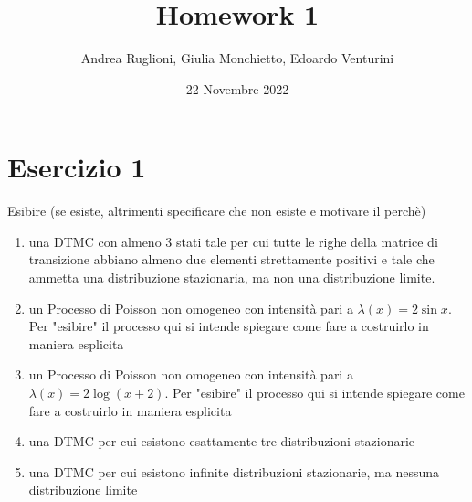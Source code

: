 \documentclass[
	12pt, %
]{fphw}
\title{Homework 1} %
\author{Andrea Ruglioni, Giulia Monchietto, Edoardo Venturini} %
\date{22 Novembre 2022} %
\institute{Politecnico di Torino} %
\begin{document}
\maketitle %

\section*{Esercizio 1}
\begin{problem}
	\smallskip
	Esibire (se esiste, altrimenti specificare che non esiste e motivare il perchè)
	\begin{enumerate}
		\item una DTMC con almeno 3 stati tale per cui tutte le righe della
		matrice di transizione abbiano almeno due elementi strettamente positivi e tale che ammetta una distribuzione stazionaria,
		ma non una distribuzione limite.
		\item un Processo di Poisson non omogeneo con intensità pari a $\lambda(x) = 2\sin x$. Per "esibire" il processo qui si intende spiegare come fare
		a costruirlo in maniera esplicita
		\item un Processo di Poisson non omogeneo con intensità pari a $\lambda(x) = 2\log (x+2)$. Per "esibire" il processo qui si intende spiegare come fare
		a costruirlo in maniera esplicita
		\item una DTMC per cui esistono esattamente tre distribuzioni stazionarie
		\item una DTMC per cui esistono infinite distribuzioni stazionarie,
		ma nessuna distribuzione limite		
	\end{enumerate}
	\smallskip
\end{problem}
\end{document}
